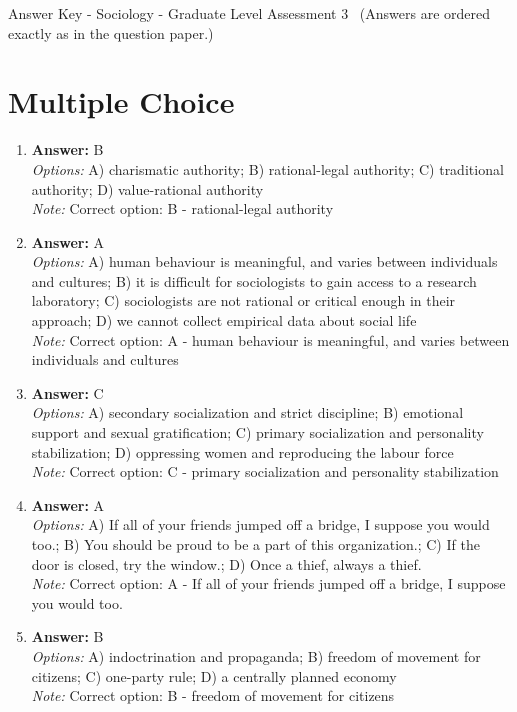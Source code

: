 \documentclass[12pt]{article}
\begin{document}
\begin{center}
Answer Key - Sociology - Graduate Level Assessment 3 \
\small (Answers are ordered exactly as in the question paper.)
\end{center}

\section*{Multiple Choice}
\begin{enumerate}[label=\arabic*.]
\item \textbf{Answer:} B
\\ \textit{Options:} A) charismatic authority; B) rational-legal authority; C) traditional authority; D) value-rational authority
\\ \textit{Note:} Correct option: B - rational-legal authority
\item \textbf{Answer:} A
\\ \textit{Options:} A) human behaviour is meaningful, and varies between individuals and cultures; B) it is difficult for sociologists to gain access to a research laboratory; C) sociologists are not rational or critical enough in their approach; D) we cannot collect empirical data about social life
\\ \textit{Note:} Correct option: A - human behaviour is meaningful, and varies between individuals and cultures
\item \textbf{Answer:} C
\\ \textit{Options:} A) secondary socialization and strict discipline; B) emotional support and sexual gratification; C) primary socialization and personality stabilization; D) oppressing women and reproducing the labour force
\\ \textit{Note:} Correct option: C - primary socialization and personality stabilization
\item \textbf{Answer:} A
\\ \textit{Options:} A) If all of your friends jumped off a bridge, I suppose you would too.; B) You should be proud to be a part of this organization.; C) If the door is closed, try the window.; D) Once a thief, always a thief.
\\ \textit{Note:} Correct option: A - If all of your friends jumped off a bridge, I suppose you would too.
\item \textbf{Answer:} B
\\ \textit{Options:} A) indoctrination and propaganda; B) freedom of movement for citizens; C) one-party rule; D) a centrally planned economy
\\ \textit{Note:} Correct option: B - freedom of movement for citizens
\end{enumerate}
\end{document}
